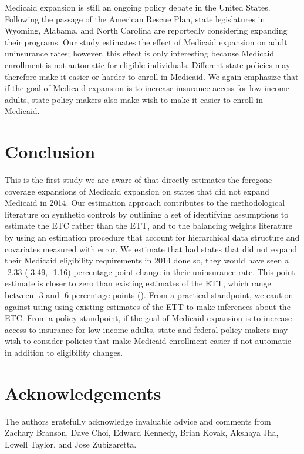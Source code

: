 \documentclass[article]{imsart}
\theoremstyle{plain}
\theoremstyle{remark}
\begin{document}
Medicaid expansion is still an ongoing policy debate in the United States. Following the passage of the American Rescue Plan, state legislatures in Wyoming, Alabama, and North Carolina are reportedly considering expanding their programs. Our study estimates the effect of Medicaid expansion on adult uninsurance rates; however, this effect is only interesting because Medicaid enrollment is not automatic for eligible individuals. Different state policies may therefore make it easier or harder to enroll in Medicaid. We again emphasize that if the goal of Medicaid expansion is to increase insurance access for low-income adults, state policy-makers also make wish to make it easier to enroll in Medicaid. 

\section{Conclusion}

This is the first study we are aware of that directly estimates the foregone coverage expansions of Medicaid expansion on states that did not expand Medicaid in 2014. Our estimation approach contributes to the methodological literature on synthetic controls by outlining a set of identifying assumptions to estimate the ETC rather than the ETT, and to the balancing weights literature by using an estimation procedure that account for hierarchical data structure and covariates measured with error. We estimate that had states that did not expand their Medicaid eligibility requirements in 2014 done so, they would have seen a -2.33 (-3.49, -1.16) percentage point change in their uninsurance rate. This point estimate is closer to zero than existing estimates of the ETT, which range between -3 and -6 percentage points (\cite{frean2017premium}). From a practical standpoint, we caution against using using existing estimates of the ETT to make inferences about the ETC. From a policy standpoint, if the goal of Medicaid expansion is to increase access to insurance for low-income adults, state and federal policy-makers may wish to consider policies that make Medicaid enrollment easier if not automatic in addition to eligibility changes.

\section*{Acknowledgements}

The authors gratefully acknowledge invaluable advice and comments from Zachary Branson, Dave Choi, Edward Kennedy, Brian Kovak, Akshaya Jha, Lowell Taylor, and Jose Zubizaretta.
\end{document}
